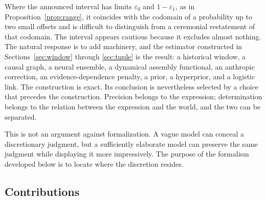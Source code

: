 \documentclass[11pt]{article}
\theoremstyle{remark}
\newcommand{\eone}{\varepsilon_1}
\newcommand{\ezero}{\varepsilon_0}
\begin{document}
Where the announced interval has limits $\ezero$ and $1-\eone$, as in Proposition~\ref{prop:range}, it coincides with the codomain of a probability up to two small offsets and is difficult to distinguish from a ceremonial restatement of that codomain. The interval appears cautious because it excludes almost nothing. The natural response is to add machinery, and the estimator constructed in Sections~\ref{sec:window} through \ref{sec:tuple} is the result: a historical window, a causal graph, a neural ensemble, a dynamical assembly functional, an anthropic correction, an evidence-dependence penalty, a prior, a hyperprior, and a logistic link. The construction is exact. Its conclusion is nevertheless selected by a choice that precedes the construction. Precision belongs to the expression; determination belongs to the relation between the expression and the world, and the two can be separated.

This is not an argument against formalization. A vague model can conceal a discretionary judgment, but a sufficiently elaborate model can preserve the same judgment while displaying it more impressively. The purpose of the formalism developed below is to locate where the discretion resides.

\subsection{Contributions}
\end{document}
